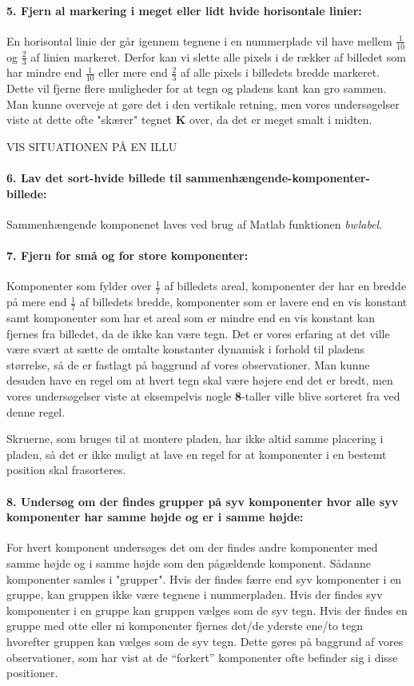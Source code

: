 \paragraph{5. Fjern al markering i meget eller lidt hvide horisontale linier:} En horisontal linie der går igennem tegnene i en nummerplade vil have mellem $\frac{1}{10}$ og $\frac{2}{3}$ af linien markeret. Derfor kan vi slette alle pixels i de rækker af billedet som har mindre end $\frac{1}{10}$ eller mere end $\frac{2}{3}$ af alle pixels i billedets bredde markeret. Dette vil fjerne flere muligheder for at tegn og pladens kant kan gro sammen. Man kunne overveje at gøre det i den vertikale retning, men vores undersøgelser viste at dette ofte "skærer" tegnet \textbf{K} over, da det er meget smalt i midten.

VIS SITUATIONEN PÅ EN ILLU
\paragraph{6. Lav det sort-hvide billede til sammenhængende-komponenter-billede:} Sammenhængende komponenet laves ved brug af Matlab funktionen \textit{bwlabel}.
\paragraph{7. Fjern for små og for store komponenter:} Komponenter som fylder over $\frac{1}{7}$ af billedets areal, komponenter der har en bredde på mere end $\frac{1}{7}$ af billedets bredde, komponenter som er lavere end en vis konstant samt komponenter som har et areal som er mindre end en vis konstant kan fjernes fra billedet, da de ikke kan være tegn. Det er vores erfaring at det ville være svært at sætte de omtalte konstanter dynamisk i forhold til pladens størrelse, så de er fastlagt på baggrund af vores observationer. Man kunne desuden have en regel om at hvert tegn skal være højere end det er bredt, men vores undersøgelser viste at eksempelvis nogle \textbf{8}-taller ville blive sorteret fra ved denne regel.

Skruerne, som bruges til at montere pladen, har ikke altid samme placering i pladen, så det er ikke muligt at lave en regel for at komponenter i en bestemt position skal frasorteres.

\paragraph{8. Undersøg om der findes grupper på syv komponenter hvor alle syv komponenter har samme højde og er i samme højde:} For hvert komponent undersøges det om der findes andre komponenter med samme højde og i samme højde som den pågældende komponent. Sådanne komponenter samles i "grupper". Hvis der findes færre end syv komponenter i en gruppe, kan gruppen ikke være tegnene i nummerpladen. Hvis der findes syv komponenter i en gruppe kan gruppen vælges som de syv tegn. Hvis der findes en gruppe med otte eller ni komponenter fjernes det/de yderste ene/to tegn hvorefter gruppen kan vælges som de syv tegn. Dette gøres på baggrund af vores observationer, som har vist at de ``forkert'' komponenter ofte befinder sig i disse positioner.


